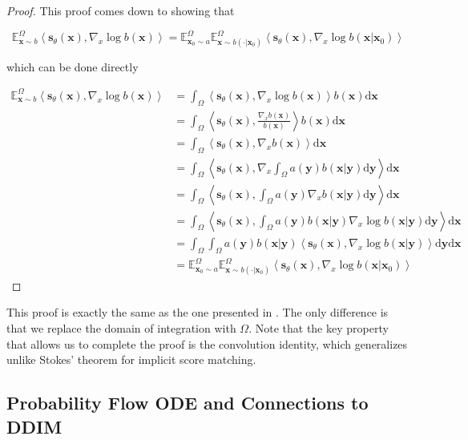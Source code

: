 \documentclass{article}
\theoremstyle{plain}
\theoremstyle{definition}
\theoremstyle{remark}
\newcommand{\E}{\mathbb{E}}
\newcommand{\grad}{\nabla}
\newcommand{\inn}[1]{\left\langle#1\right\rangle}
\renewcommand{\vec}{\mathbf}
\newcommand{\dd}{\mathrm{d}}
\begin{document}
\begin{proof}
    This proof comes down to showing that

    \begin{equation}
        \E_{\vec{x} \sim b}^\Omega \inn{\vec{s}_\theta(\vec{x}), \grad_x \log b(\vec{x})} = \E_{\vec{x}_0 \sim a}^\Omega \E_{\vec{x} \sim b(\cdot | \vec{x}_0)}^\Omega \inn{\vec{s}_\theta(\vec{x}), \grad_x \log b(\vec{x} | \vec{x}_0)}
    \end{equation}

    which can be done directly

    \begin{align}
        \E_{\vec{x} \sim b}^\Omega \inn{\vec{s}_\theta(\vec{x}), \grad_x \log b(\vec{x})} &= \int_\Omega \inn{\vec{s}_\theta(\vec{x}), \grad_x \log b(\vec{x})} b(\vec{x}) \dd \vec{x}\\
        &= \int_\Omega \inn{\vec{s}_\theta(\vec{x}), \frac{\grad_x b(\vec{x})}{b(\vec{x})} }b(\vec{x}) \dd \vec{x}\\
        &= \int_\Omega \inn{\vec{s}_\theta(\vec{x}), \grad_x b(\vec{x})}\dd \vec{x}\\
        &= \int_\Omega \inn{\vec{s}_\theta(\vec{x}), \grad_x \int_\Omega a(\vec{y}) b(\vec{x} | \vec{y}) \dd \vec{y}}\dd \vec{x}\\
        &= \int_\Omega \inn{\vec{s}_\theta(\vec{x}), \int_\Omega a(\vec{y}) \grad_x b(\vec{x} | \vec{y}) \dd \vec{y}}\dd \vec{x}\\
        &= \int_\Omega \inn{\vec{s}_\theta(\vec{x}), \int_\Omega a(\vec{y}) b(\vec{x} | \vec{y}) \grad_x \log b(\vec{x} | \vec{y}) \dd \vec{y}}\dd \vec{x}\\
        &= \int_\Omega \int_\Omega a(\vec{y}) b(\vec{x} | \vec{y}) \inn{\vec{s}_\theta(\vec{x}), \grad_x \log b(\vec{x} | \vec{y})} \dd\vec{y}\dd \vec{x}\\
        &= \E_{\vec{x}_0 \sim a}^\Omega \E_{\vec{x} \sim b(\cdot | \vec{x}_0)}^\Omega \inn{\vec{s}_\theta(\vec{x}), \grad_x \log b(\vec{x} | \vec{x}_0)}
    \end{align}
\end{proof}

This proof is exactly the same as the one presented in \citep{Vincent2011ACB}. The only difference is that we replace the domain of integration with $\Omega$. Note that the key property that allows us to complete the proof is the convolution identity, which generalizes unlike Stokes' theorem for implicit score matching.

\subsection{Probability Flow ODE and Connections to DDIM}\label{sec:app:theory:ode}
\end{document}
